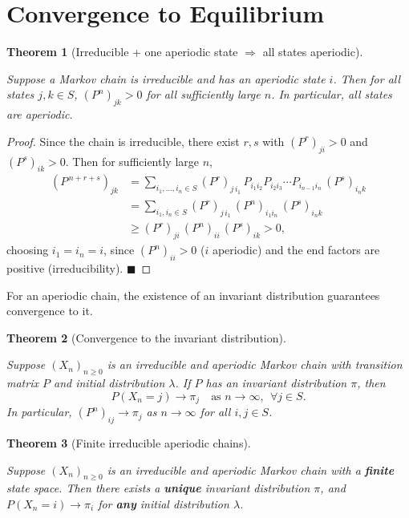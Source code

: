 \documentclass[
  letterpaper,
  DIV=11,
  numbers=noendperiod]{scrreprt}
\theoremstyle{definition}
\theoremstyle{plain}
\newtheorem{theorem}{Theorem}[chapter]
\theoremstyle{plain}
\theoremstyle{definition}
\theoremstyle{plain}
\theoremstyle{plain}
\theoremstyle{remark}
\begin{document}
\section{Convergence to Equilibrium}\label{convergence-to-equilibrium}

\begin{theorem}[Irreducible + one aperiodic state \(\Rightarrow\) all
states
aperiodic]\protect\hypertarget{thm-irreducible-aperiodic}{}\label{thm-irreducible-aperiodic}

Suppose a Markov chain is irreducible and has an aperiodic state \(i\).
Then for all states \(j, k \in S\), \((P^n)_{jk} > 0\) for all
sufficiently large \(n\). In particular, all states are aperiodic.

\end{theorem}

\begin{proof}
Since the chain is irreducible, there exist \(r, s\) with
\((P^r)_{ji} > 0\) and \((P^s)_{ik} > 0\). Then for sufficiently large
\(n\), \[
\begin{aligned}
(P^{\,n + r + s})_{jk}
&= \sum_{i_1, \dots, i_n \in S} (P^r)_{j\, i_1}\, P_{i_1 i_2} P_{i_2 i_3} \cdots P_{i_{n-1} i_n}\, (P^s)_{i_n k} \\
&= \sum_{i_1, i_n \in S} (P^r)_{j\, i_1}\, (P^n)_{i_1 i_n}\, (P^s)_{i_n k} \\
&\ge (P^r)_{ji}\, (P^n)_{ii}\, (P^s)_{ik} > 0 ,
\end{aligned}
\] choosing \(i_1 = i_n = i\), since \((P^n)_{ii} > 0\) (\(i\)
aperiodic) and the end factors are positive (irreducibility).
\(\blacksquare\)
\end{proof}

For an aperiodic chain, the existence of an invariant distribution
guarantees convergence to it.

\begin{theorem}[Convergence to the invariant
distribution]\protect\hypertarget{thm-convergence}{}\label{thm-convergence}

Suppose \((X_n)_{n \ge 0}\) is an irreducible and aperiodic Markov chain
with transition matrix \(P\) and initial distribution \(\lambda\). If
\(P\) has an invariant distribution \(\pi\), then \[
P(X_n = j) \to \pi_j \quad\text{as } n \to \infty, \ \ \forall j \in S .
\] In particular, \((P^n)_{ij} \to \pi_j\) as \(n \to \infty\) for all
\(i, j \in S\).

\end{theorem}

\begin{theorem}[Finite irreducible aperiodic
chains]\protect\hypertarget{thm-unique-stationary}{}\label{thm-unique-stationary}

Suppose \((X_n)_{n \ge 0}\) is an irreducible and aperiodic Markov chain
with a \textbf{finite} state space. Then there exists a \textbf{unique}
invariant distribution \(\pi\), and \(P(X_n = i) \to \pi_i\) for
\textbf{any} initial distribution \(\lambda\).

\end{theorem}
\end{document}
